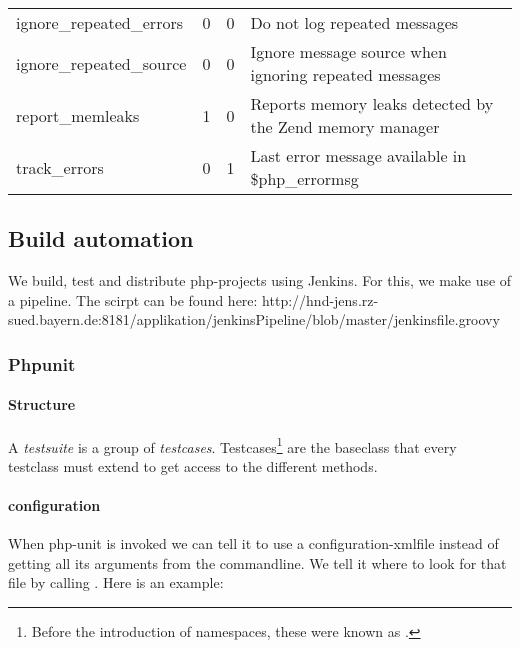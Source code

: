 \begin{table}[h]
\begin{tabular}{@{}llll@{}}
ignore\_repeated\_errors & 0               & 0                                   & Do not log repeated messages                                                                                                       \\
ignore\_repeated\_source & 0               & 0                                   & Ignore message source when ignoring repeated messages                                                                              \\
report\_memleaks         & 1               & 0                                   & Reports memory leaks detected by the Zend memory manager                                                                           \\
track\_errors            & 0               & 1                                   & Last error message available in \$php\_errormsg                                                                                    \\ \bottomrule
\end{tabular}
\end{table}


\subsection{Build automation}

We build, test and distribute php-projects using Jenkins. For this, we make use of a pipeline. The scirpt can be found here: http://hnd-jens.rz-sued.bayern.de:8181/applikation/jenkinsPipeline/blob/master/jenkinsfile.groovy





\subsubsection{Phpunit}

\paragraph{Structure} A \emph{testsuite} is a group of \emph{testcases}. Testcases\footnote{Before the introduction of namespaces, these were known as .} are the baseclass that every testclass must extend to get access to the different  methods. 

\paragraph{configuration} When php-unit is invoked we can tell it to use a configuration-xmlfile instead of getting all its arguments from the commandline. We tell it where to look for that file by calling . Here is an example: 

